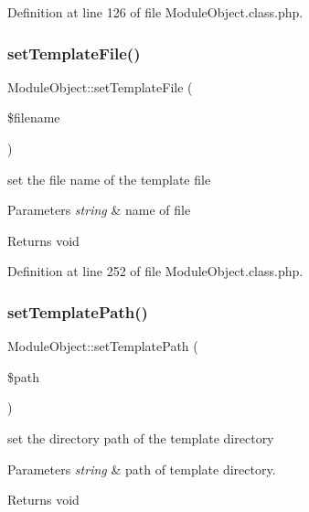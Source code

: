 Definition at line 126 of file Module\+Object.\+class.\+php.

\mbox{\label{classModuleObject_aa38e116023d54d3f5d8f507bb87663f4}} 
\subsubsection{\texorpdfstring{set\+Template\+File()}{setTemplateFile()}}
{\footnotesize\ttfamily Module\+Object\+::set\+Template\+File (\begin{DoxyParamCaption}\item[{}]{\$filename }\end{DoxyParamCaption})}

set the file name of the template file 
\begin{DoxyParams}{Parameters}
{\em string} & name of file \\
\hline
\end{DoxyParams}
\begin{DoxyReturn}{Returns}
void 
\end{DoxyReturn}


Definition at line 252 of file Module\+Object.\+class.\+php.

\mbox{\label{classModuleObject_a440407bd8b6b16eb03115ad4a5c5835a}} 
\subsubsection{\texorpdfstring{set\+Template\+Path()}{setTemplatePath()}}
{\footnotesize\ttfamily Module\+Object\+::set\+Template\+Path (\begin{DoxyParamCaption}\item[{}]{\$path }\end{DoxyParamCaption})}

set the directory path of the template directory 
\begin{DoxyParams}{Parameters}
{\em string} & path of template directory. \\
\hline
\end{DoxyParams}
\begin{DoxyReturn}{Returns}
void 
\end{DoxyReturn}


